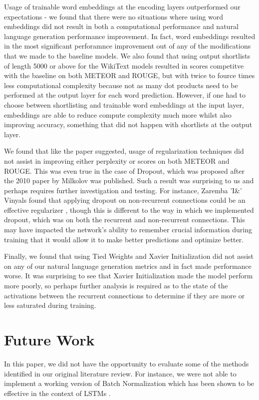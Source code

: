 \documentclass[a4paper]{article}
\begin{document}
Usage of trainable word embeddings at the encoding layers outperformed our expectations -
we found that there were no situations where using word embeddings did not result in both
a computational performance and natural language generation performance improvement. In fact,
word embeddings resulted in the most significant perforamnce improvement out of any of the
modifications that we made to the baseline models. We also found that using output shortlists
of length 5000 or above for the WikiText models resulted in scores competitve with the baseline
on both METEOR and ROUGE, but with twice to fource times less computational complexity because
not as many dot products need to be performed at the output layer for each word prediction. However,
if one had to choose between shortlisting and trainable word embeddings at the input layer, embeddings
are able to reduce compute complexity much more whilst also improving accuracy, something that
did not happen with shortlists at the output layer.

We found that like the paper suggested, usage of regularization techniques did not assist in improving
either perplexity or scores on both METEOR and ROUGE. This was even true in the case of Dropout,
which was proposed after the 2010 paper by Milkolov was published. Such a result was surprising to us
and perhaps requires further investigation and testing. For instance, Zaremba 'I\&' Vinyals found that
applying dropout on non-recurrent connections could be an effective regularizer \cite{zaremba2015},
though this is different to the way in which we implemented dropout, which was on both the recurrent
and non-recurrent connections. This may have impacted the network's ability to remember crucial
information during training that it would allow it to make better predictions and optimize better.

Finally, we found that using Tied Weights and Xavier Initialization did not assist on any of our
natural language generation metrics and in fact made performance worse. It was surprising to see
that Xavier Initialization made the model perform more poorly, so perhaps further analysis is required
as to the state of the activations between the recurrent connections to determine if they are more
or less saturated during training.

\section{Future Work}
\label{sec:future}

In this paper, we did not have the opportunity to evaluate some of the methods identified in our
original literature review. For instance, we were not able to implement a working version of
Batch Normalization \cite{ioffe} which has been shown to be effective in the context of LSTMs \cite{courville2017}.
\end{document}
